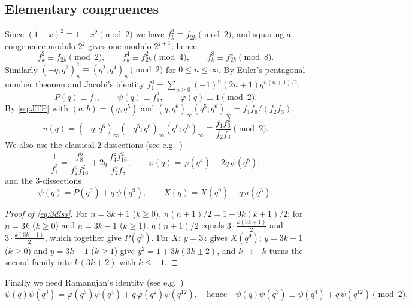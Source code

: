 \documentclass[11pt]{amsart}
\theoremstyle{definition}
\theoremstyle{remark}
\numberwithin{equation}{section}
\begin{document}
\subsection{Elementary congruences}
Since $(1-x)^2\equiv 1-x^2\pmod 2$ we have $f_k^2\equiv f_{2k}\pmod 2$, and squaring a congruence modulo $2^j$ gives one modulo $2^{j+1}$; hence
\begin{equation}\label{eq:frob}
f_k^{2}\equiv f_{2k}\pmod 2,\qquad f_k^{4}\equiv f_{2k}^{2}\pmod 4,\qquad f_k^{8}\equiv f_{2k}^{4}\pmod 8 .
\end{equation}
Similarly $(-q;q^2)_n^2\equiv(q^2;q^4)_n\pmod 2$ for $0\le n\le\infty$. By Euler's pentagonal number theorem and Jacobi's identity $f_1^3=\sum_{n\ge0}(-1)^n(2n+1)q^{n(n+1)/2}$,
\begin{equation}\label{eq:mod2basic}
P(q)\equiv f_1,\qquad \psi(q)\equiv f_1^3,\qquad \varphi(q)\equiv 1\pmod 2 .
\end{equation}
By \eqref{eq:JTP} with $(a,b)=(q,q^5)$ and $(q;q^6)_\infty(q^5;q^6)_\infty=f_1f_6/(f_2f_3)$,
\begin{equation}\label{eq:umod2}
u(q)=(-q;q^6)_\infty(-q^5;q^6)_\infty(q^6;q^6)_\infty\equiv \frac{f_1f_6^2}{f_2f_3}\pmod 2 .
\end{equation}
We also use the classical $2$-dissections (see e.g.\ \cite[Ch.~1]{Hir})
\begin{equation}\label{eq:2diss}
\frac{1}{f_1^2}=\frac{f_8^5}{f_2^5f_{16}^2}+2q\,\frac{f_4^2f_{16}^2}{f_2^5f_8},\qquad
\varphi(q)=\varphi(q^4)+2q\,\psi(q^8),
\end{equation}
and the $3$-dissections
\begin{equation}\label{eq:3diss}
\psi(q)=P(q^3)+q\,\psi(q^9),\qquad X(q)=X(q^9)+q\,u(q^3).
\end{equation}
\begin{proof}[Proof of \eqref{eq:3diss}]
For $n=3k+1$ ($k\ge0$), $n(n+1)/2=1+9k(k+1)/2$; for $n=3k$ ($k\ge0$) and $n=3k-1$ ($k\ge1$), $n(n+1)/2$ equals $3\cdot\frac{k(3k+1)}{2}$ and $3\cdot\frac{k(3k-1)}{2}$, which together give $P(q^3)$. For $X$: $y=3z$ gives $X(q^9)$; $y=3k+1$ ($k\ge0$) and $y=3k-1$ ($k\ge1$) give $y^2=1+3k(3k\pm2)$, and $k\mapsto -k$ turns the second family into $k(3k+2)$ with $k\le -1$.
\end{proof}

Finally we need Ramanujan's identity (see e.g.\ \cite[Cor.~2.5]{Cao})
\begin{equation}\label{eq:ramanujan}
\psi(q)\psi(q^3)=\varphi(q^6)\psi(q^4)+q\,\varphi(q^2)\psi(q^{12}),
\quad\text{hence}\quad
\psi(q)\psi(q^3)\equiv\psi(q^4)+q\,\psi(q^{12})\pmod 2 .
\end{equation}
\end{document}
